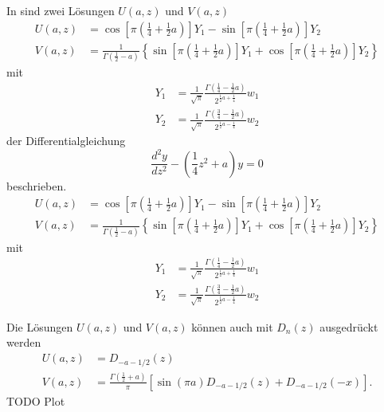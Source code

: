 In \cite{parzyl:abramowitz-stegun} sind zwei Lösungen $U(a, z)$ und $V(a,z)$ 
\begin{align}
    U(a,z) &= 
    \cos\left[\pi \left({\textstyle \frac{1}{4}} + {\textstyle \frac{1}{2}} a\right)\right] Y_1
    - \sin\left[\pi \left({\textstyle \frac{1}{4}} + {\textstyle \frac{1}{2}} a\right)\right] Y_2 \\
    V(a,z) &= \frac{1}{\Gamma \left({\textstyle \frac{1}{2} - a}\right)} \left\{
    \sin\left[\pi \left({\textstyle \frac{1}{4}} + {\textstyle \frac{1}{2}} a\right)\right] Y_1
    + \cos\left[\pi \left({\textstyle \frac{1}{4}} + {\textstyle \frac{1}{2}} a\right)\right] Y_2
    \right\}
\end{align}
mit
\begin{align}
    Y_1 &= \frac{1}{\sqrt{\pi}} 
            \frac{\Gamma\left({\textstyle \frac{1}{4} - 
            {\textstyle \frac{1}{2}}a}\right)}
            {2^{\frac{1}{2} a + \frac{1}{4}}} w_1\\
    Y_2 &= \frac{1}{\sqrt{\pi}} 
            \frac{\Gamma\left({\textstyle \frac{3}{4} - 
            {\textstyle \frac{1}{2}}a}\right)}
            {2^{\frac{1}{2} a - \frac{1}{4}}} w_2
\end{align}
der Differentialgleichung
\begin{equation}
    \frac{d^2 y}{d z^2} - \left(\frac{1}{4} z^2 + a\right) y = 0
\end{equation}
beschrieben.
\begin{align}
    U(a,z) &= 
    \cos\left[\pi \left({\textstyle \frac{1}{4}} + {\textstyle \frac{1}{2}} a\right)\right] Y_1
    - \sin\left[\pi \left({\textstyle \frac{1}{4}} + {\textstyle \frac{1}{2}} a\right)\right] Y_2 \\
    V(a,z) &= \frac{1}{\Gamma \left({\textstyle \frac{1}{2} - a}\right)} \left\{
    \sin\left[\pi \left({\textstyle \frac{1}{4}} + {\textstyle \frac{1}{2}} a\right)\right] Y_1
    + \cos\left[\pi \left({\textstyle \frac{1}{4}} + {\textstyle \frac{1}{2}} a\right)\right] Y_2
    \right\}
\end{align}
mit
\begin{align}
    Y_1 &= \frac{1}{\sqrt{\pi}} 
            \frac{\Gamma\left({\textstyle \frac{1}{4} - 
            {\textstyle \frac{1}{2}}a}\right)}
            {2^{\frac{1}{2} a + \frac{1}{4}}} w_1\\
    Y_2 &= \frac{1}{\sqrt{\pi}} 
            \frac{\Gamma\left({\textstyle \frac{3}{4} - 
            {\textstyle \frac{1}{2}}a}\right)}
            {2^{\frac{1}{2} a - \frac{1}{4}}} w_2
\end{align}

Die Lösungen $U(a,z)$ und $V(a, z)$ können auch mit $D_n(z)$
ausgedrückt werden
\begin{align}
    U(a,z) &= D_{-a-1/2}(z) \\
    V(a,z) &= \frac{\Gamma \left({\textstyle \frac{1}{2}} + a\right)}{\pi}
    \left[\sin\left(\pi a\right) D_{-a-1/2}(z) + D_{-a-1/2}(-x)\right].
\end{align}
TODO Plot